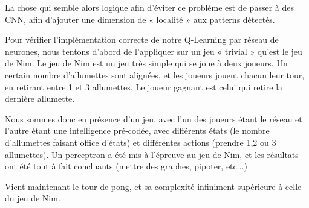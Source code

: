 \documentclass[
    10pt,
    a4paper,
    oneside,
    headinclude,footinclude,
    BCOR=5mm,
    captions=tableabove
]{scrartcl}
\begin{document}
La chose qui semble alors logique afin d’éviter ce problème est de passer à des CNN, afin d’ajouter une dimension de « localité » aux patterns détectés.

Pour vérifier l’implémentation correcte de notre Q-Learning par réseau de neurones, nous tentons d’abord de l’appliquer sur un jeu « trivial » qu’est le jeu de Nim. Le jeu de Nim est un jeu très simple qui se joue à deux joueurs. Un certain nombre d’allumettes sont alignées, et les joueurs jouent chacun leur tour, en retirant entre 1 et 3 allumettes. Le joueur gagnant est celui qui retire la dernière allumette.

Nous sommes donc en présence d’un jeu, avec l’un des joueurs étant le réseau et l’autre étant une intelligence pré-codée, avec différents états (le nombre d’allumettes faisant office d’états) et différentes actions (prendre 1,2 ou 3 allumettes). Un perceptron a été mis à l’épreuve au jeu de Nim, et les résultats ont été tout à fait concluants (mettre des graphes, pipoter, etc...)

Vient maintenant le tour de pong, et sa complexité infiniment supérieure à celle du jeu de Nim.
\end{document}
